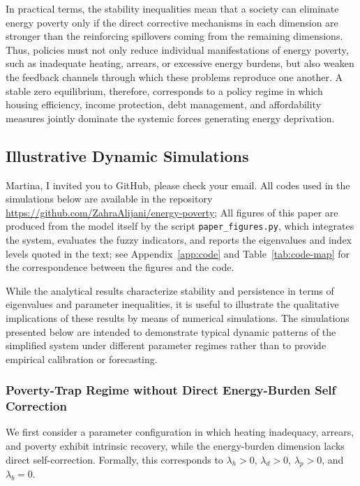 \documentclass[11pt,a4paper]{article}
\newcommand{\codeurl}{https://github.com/ZahraAlijani/energy-poverty}
\begin{document}
In practical terms, the stability inequalities mean that a society can eliminate energy poverty only if the direct corrective mechanisms in each dimension are stronger than the reinforcing spillovers coming from the remaining dimensions. Thus, policies must not only reduce individual manifestations of energy poverty, such as inadequate heating, arrears, or excessive energy burdens, but also weaken the feedback channels through which these problems reproduce one another. A stable zero equilibrium, therefore, corresponds to a policy regime in which housing efficiency, income protection, debt management, and affordability measures jointly dominate the systemic forces generating energy deprivation.
\subsection{Illustrative Dynamic Simulations}\label{sec:sim}
{\color{red} Martina, I invited you to GitHub, please check your email.}
All codes used in the simulations below are available in the repository
\url{\codeurl}; 
All figures of this paper are produced from the model itself by the script
\texttt{paper\_figures.py}, which integrates the system, evaluates the fuzzy
indicators, and reports the eigenvalues and index levels quoted in the text; see
Appendix~\ref{app:code} and Table~\ref{tab:code-map} for the correspondence
between the figures and the code.

While the analytical results characterize stability and persistence in terms of
eigenvalues and parameter inequalities, it is useful to illustrate the
qualitative implications of these results by means of numerical simulations.
The simulations presented below are intended to demonstrate typical dynamic
patterns of the simplified system under different parameter regimes rather than
to provide empirical calibration or forecasting.

\subsubsection{Poverty-Trap Regime without Direct Energy-Burden Self Correction}\label{sec:sim-trap}

We first consider a parameter configuration in which heating inadequacy,
arrears, and poverty exhibit intrinsic recovery, while the energy-burden
dimension lacks direct self-correction. Formally, this corresponds to
$\lambda_h>0$, $\lambda_d>0$, $\lambda_p>0$, and $\lambda_b=0$.
\end{document}
